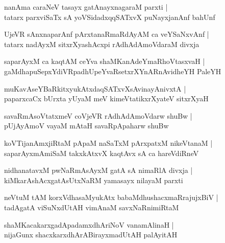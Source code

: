 \begin{shloka}
nanAma caraNeV tasayx gatAnayxnagaraM parxti |\\
tatarx parxviSaTx sA yoVSidadxqqSATxvX puNayxjanAnf bahUnf 
\end{shloka}

\begin{shloka}
UjeVR sAnxnaparAnf pArxtanaRmaRdAyAM ca veYSaNxvAnf |\\
tatarx nadAyxM sitxrXyashAcxpi rAdhAdAmoVdaraM divxja
\end{shloka}

\begin{shloka}
saparAyxM ca kaqtAM ceYva shaMKanAdeYmaRhoVtasxvaH |\\
gaMdhapuSepxYdiVRpadhUpeYvaRsetxrXYnARnAvidheYH PaleYH
\end{shloka}

\begin{shloka}
muKavAseYBaRkitxyukAtxdaqSATxvXsAvinayAnivxtA |\\
paparxcaCx bUrxta yUyaM meV kimeVtatikxrXyateV sitxrXyaH 
\end{shloka}

\begin{shloka}
savaRmAsoVtatxmeV coVjeVR rAdhAdAmoVdarw shuBw |\\
pUjAyAmoV vayaM mAtaH savaRpApaharw shuBw
\end{shloka}

\begin{shloka}
koVTijanAmxjiRtaM pApaM naSaTxM pArxpatxM nikeVtanaM |\\
saparAyxmAmiSaM takxkAtxvX kaqtAvx sA ca hareVdiRneV 
\end{shloka}

\begin{shloka}
nidhanatavxM pwNaRmAsAyxM gatA sA nimaRlA divxja |\\
kiMkarAshAcxgatAsUtxNaRM yamasayx nilayaM parxti
\end{shloka}

\begin{shloka}
neVtuM tAM korxVdhasaMyukAtx babaMdhushacxmaRrajujxBiV |\\
tadAgatA viSuNxdUtAH vimAnaM savxNaRnimiRtaM 
\end{shloka}

\begin{shloka}
shaMKacakarxgadApadamxdhAriNoV vanamAlinaH |\\
nijaGunx shacxkarxdhArABirayxmadUtAH palAyitAH
\end{shloka}

